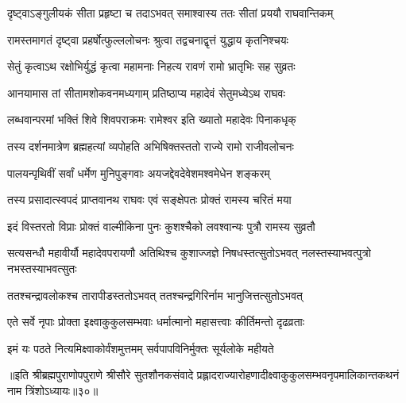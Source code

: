 \twolineshloka
{दृष्ट्वाऽङ्गुलीयकं सीता प्रहृष्टा च तदाऽभवत्}
{समाश्वास्य ततः सीतां प्रययौ राघवान्तिकम्} %

\twolineshloka
{रामस्तमागतं दृष्ट्वा प्रहर्षोत्फुल्ललोचनः}
{श्रुत्वा तद्वचनाद्वृत्तं युद्धाय कृतनिश्चयः} %

\twolineshloka
{सेतुं कृत्वाऽथ रक्षोभिर्युद्धं कृत्वा महामनाः}
{निहत्य रावणं रामो भ्रातृभिः सह सुव्रतः} %

\twolineshloka
{आनयामास तां सीतामशोकवनमध्यगाम्}
{प्रतिष्ठाप्य महादेवं सेतुमध्येऽथ राघवः} %

\twolineshloka
{लब्धवान्परमां भक्तिं शिवे शिवपराक्रमः}
{रामेश्वर इति ख्यातो महादेवः पिनाकधृक्} %

\twolineshloka
{तस्य दर्शनमात्रेण ब्रह्महत्यां व्यपोहति}
{अभिषिक्तस्ततो राज्ये रामो राजीवलोचनः} %

\twolineshloka
{पालयन्पृथिवीं सर्वां धर्मेण मुनिपुङ्गवाः}
{अयजद्देवदेवेशमश्वमेधेन शङ्करम्} %

\twolineshloka
{तस्य प्रसादात्स्वपदं प्राप्तवानथ राघवः}
{एवं सङ्क्षेपतः प्रोक्तं रामस्य चरितं मया} %

\twolineshloka
{इदं विस्तरतो विप्राः प्रोक्तं वाल्मीकिना पुनः}
{कुशश्चैको लवश्वान्यः पुत्रौ रामस्य सुव्रतौ} %

\threelineshloka
{सत्यसन्धौ महावीर्यौ महादेवपरायणौ}
{अतिथिश्च कुशाज्जज्ञे निषधस्तत्सुतोऽभवत्}
{नलस्तस्याभवत्पुत्रो नभस्तस्याभवत्सुतः} %

\twolineshloka
{ततश्चन्द्रावलोकश्च तारापीडस्ततोऽभवत्}
{ततश्चन्द्रगिरिर्नाम भानुजित्तत्सुतोऽभवत्} %

\twolineshloka
{एते सर्वे नृपाः प्रोक्ता इक्ष्वाकुकुलसम्भवाः}
{धर्मात्मानो महासत्त्वाः कीर्तिमन्तो दृढव्रताः} %

\twolineshloka
{इमं यः पठते नित्यमिक्ष्वाकोर्वंशमुत्तमम्}
{सर्वपापविनिर्मुक्तः सूर्यलोके महीयते} %

॥इति श्रीब्रह्मपुराणोपपुराणे श्रीसौरे सुतशौनकसंवादे प्रह्लादराज्यारोहणादीक्ष्वाकुकुलसम्भवनृपमालिकान्तकथनं नाम त्रिंशोऽध्यायः॥३०॥

\closesection
